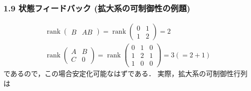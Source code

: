 \documentclass[10pt]{beamer}
\begin{document}
\begin{frame}[t]
\frametitle{1.9 状態フィードバック (拡大系の可制御性の例題)}
 

\begin{gather}
 \operatorname{rank}
 \left(
 \begin{array}{cc}
  B & AB
 \end{array}
 \right) =
 \operatorname{rank}
 \left(
 \begin{array}{cc}
  0 & 1 \\
  1 & 2
 \end{array}
 \right) = 2 \\
 \operatorname{rank}
 \left(
 \begin{array}{cc}
  A & B \\
  C & 0
 \end{array}
 \right) =
 \operatorname{rank}
 \left(
 \begin{array}{ccc}
  0 & 1 & 0 \\
  1 & 2 & 1 \\
  1 & 0 & 0
 \end{array}
 \right) =
 3(= 2 + 1)
\end{gather}
であるので，この場合安定化可能なはずである．
実際，拡大系の可制御性行列は


\end{frame}
\end{document}
